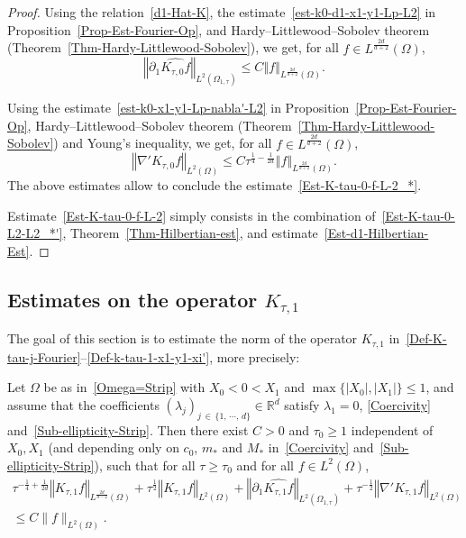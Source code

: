 \documentclass[AHL,Unicode,longabstracts]{cedram}
\newcommand*\R{\mathbb{R}}
\newcommand{\norm}[1]{\left\Vert#1\right\Vert}
\renewcommand{\leq}{\leqslant}
\renewcommand{\geq}{\geqslant}
\begin{document}
\begin{proof}
Using the relation~\eqref{d1-Hat-K}, the estimate~\eqref{est-k0-d1-x1-y1-Lp-L2} in Proposition~\ref{Prop-Est-Fourier-Op}, and Hardy--Little\-wood--Sobolev theorem (Theorem~\ref{Thm-Hardy-Littlewood-Sobolev}), we get, for all $f \in L^{\frac{2d}{d+2}}(\Omega)$,
\begin{equation*}
\norm{\partial_1 \widehat{ K_{\tau,0} f}}_{L^2(\Omega_{1, \tau})}
\leq C \norm{f}_{L^{\frac{2d}{d+2}}(\Omega)}.
\end{equation*}

Using the estimate~\eqref{est-k0-x1-y1-Lp-nabla'-L2} in Proposition~\ref{Prop-Est-Fourier-Op}, Hardy--Littlewood--Sobolev theorem (Theorem~\ref{Thm-Hardy-Littlewood-Sobolev}) and Young's inequality, we get, for all $f \in L^{\frac{2d}{d+2}}(\Omega)$,
\begin{equation*}
\norm{\nabla' K_{\tau, 0} f}_{L^{2}(\Omega)}
\leq C{\tau^{\frac{1}{4}-\frac{1}{2d}}} \norm{f}_{L^{\frac{2d}{d+2}}(\Omega)}.
\end{equation*}
The above estimates allow to conclude the estimate~\eqref{Est-K-tau-0-f-L-2_*}.

Estimate~\eqref{Est-K-tau-0-f-L-2} simply consists in the combination of~\eqref{Est-K-tau-0-L2-L2_*'}, Theorem~\ref{Thm-Hilbertian-est}, and estimate~\eqref{Est-d1-Hilbertian-Est}.
\end{proof}



\subsection{Estimates on the operator \texorpdfstring{$K_{\tau, 1}$}{K tau, 1}} The goal of this section is to estimate the norm of the operator $K_{\tau, 1}$ in~\eqref{Def-K-tau-j-Fourier}--\eqref{Def-k-tau-1-x1-y1-xi'}, more precisely:
\begin{prop}\label{Prop-OpNorm-Est-K1}
Let $\Omega$ be as in~\eqref{Omega=Strip} with $X_0 \! <\! 0\! <\! X_1$ and $\max\{|X_0|, |X_1|\} \leq 1$, and assume that the coefficients $(\lambda_j)_{j\, \in\,\{1,\,\cdots,\,d\}} \in \R^d$ satisfy $\lambda_1 = 0$, \eqref{Coercivity} and~\eqref{Sub-ellipticity-Strip}. Then there exist $C>0$ and $\tau_0 \geq 1$ independent of $X_0, X_1$ (and depending only on $c_0$, $m_*$ and $M_*$ in~\eqref{Coercivity} and~\eqref{Sub-ellipticity-Strip}), such that for all $\tau \geq \tau_0$ and for all $f \in L^2(\Omega)$,
\begin{multline*}
\tau^{-\frac{1}{4}+\frac{1}{2d}}\norm{ K_{\tau,1} f}_{L^{\frac{2d}{d-2}}(\Omega)} +
\tau^{\frac{1}{2}} \norm{K_{\tau,1} f}_{L^{2}(\Omega)} +
\norm{\partial_1 \widehat{ K_{\tau,1} f}}_{L^2(\Omega_{1, \tau})} +
\tau^{-\frac{1}{2}} \norm{\nabla' K_{\tau,1} f}_{L^2(\Omega)} \\
\leq C \| f \|_{L^2(\Omega)}.
\end{multline*}
\end{prop}
\end{document}
